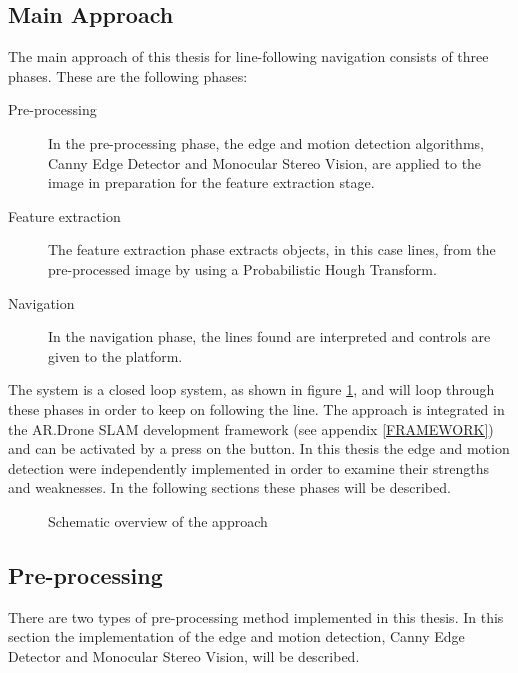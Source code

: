 \documentclass[a4paper]{article}
\begin{document}
\subsection{Main Approach}
The main approach of this thesis for line-following navigation consists of three phases. These are the following phases:
\begin{description}
\item[Pre-processing] In the pre-processing phase, the edge and motion detection algorithms, Canny Edge Detector and Monocular Stereo Vision, are applied to the image in preparation for the feature extraction stage.
\item[Feature extraction] The feature extraction phase extracts objects, in this case lines, from the pre-processed image by using a Probabilistic Hough Transform.
\item[Navigation] In the navigation phase, the lines found are interpreted and controls are given to the platform.
\end{description}
The system is a closed loop system, as shown in figure \ref{system_overview}, and will loop through these phases in order to keep on following the line. The approach is integrated in the AR.Drone SLAM \cite{Dijkshoorn2012} development framework (see appendix \ref{FRAMEWORK}) and can be activated by a press on the button. In this thesis the edge and motion detection were independently implemented in order to examine their strengths and weaknesses. In the following sections these phases will be described.

\begin{figure}[!ht]
\centerline{
}
\caption{Schematic overview of the approach}
\label{system_overview}
\end{figure}

\subsection{Pre-processing}
There are two types of pre-processing method implemented in this thesis. In this section the implementation of the edge and motion detection, Canny Edge Detector and Monocular Stereo Vision, will be described.
\end{document}
